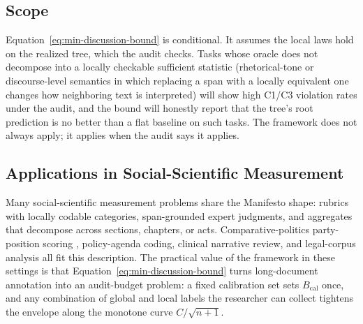 \subsection{Scope}\label{sec:min-scope}

Equation~\eqref{eq:min-discussion-bound} is conditional. It assumes the
local laws hold on the realized tree, which the audit checks. Tasks whose
oracle does not decompose into a locally checkable sufficient statistic
(rhetorical-tone or discourse-level semantics in which replacing a span
with a locally equivalent one changes how neighboring text is interpreted)
will show high C1/C3 violation rates under the audit, and the bound will
honestly report that the tree's root prediction is no better than a flat
baseline on such tasks. The framework does not always apply; it applies
when the audit says it applies.

\subsection{Applications in Social-Scientific Measurement}\label{sec:min-applications-discussion}

Many social-scientific measurement problems share the Manifesto shape:
rubrics with locally codable categories, span-grounded expert judgments,
and aggregates that decompose across sections, chapters, or acts.
Comparative-politics party-position scoring
\citep{BenoitEtAl2025,ManifestoProject2025a}, policy-agenda coding,
clinical narrative review, and legal-corpus analysis all fit this
description. The practical value of the framework in these settings is
that Equation~\eqref{eq:min-discussion-bound} turns long-document
annotation into an audit-budget problem: a fixed calibration set sets
$B_{\mathrm{cal}}$ once, and any combination of global and local labels
the researcher can collect tightens the envelope along the monotone curve
$C/\sqrt{n+1}$.
